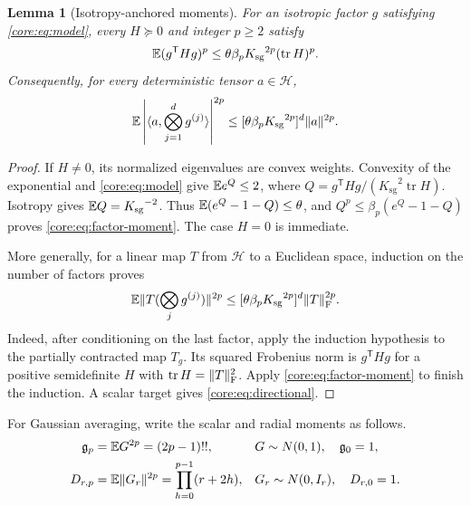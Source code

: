 \documentclass[11pt,a4paper]{article}
\newtheorem{lemma}[theorem]{Lemma}
\theoremstyle{definition}\newtheorem{definition}[theorem]{Definition}
\theoremstyle{remark}\newtheorem{remark}[theorem]{Remark}
\numberwithin{equation}{section}
\newcommand{\Ksg}{{K_{\mathrm{sg}}}}\newcommand{\Cfour}{{C_4}}
\newcommand{\gmom}{\mathfrak g}
\newcommand{\norm}[1]{\lVert#1\rVert}\newcommand{\ip}[2]{\langle#1,#2\rangle}
\DeclareMathOperator{\tr}{tr}\DeclareMathOperator{\rank}{rank}
\begin{document}
\begin{lemma}[Isotropy-anchored moments]\label{core:lem:factor}
For an isotropic factor $g$ satisfying \eqref{core:eq:model}, every $H\succeq0$ and
integer $p\ge2$ satisfy
\begin{equation}\label{core:eq:factor-moment}
 \E(g^{\mathsf T}Hg)^p\le
 \theta\beta_p\Ksg^{2p}(\tr H)^p.
\end{equation}
Consequently, for every deterministic tensor $a\in\mathcal H$,
\begin{equation}\label{core:eq:directional}
 \E\left|\ip a{\bigotimes_{j=1}^dg^{(j)}}\right|^{2p}
 \le[\theta\beta_p\Ksg^{2p}]^d\norm a^{2p}.
\end{equation}
\end{lemma}
\begin{proof}
If $H\ne0$, its normalized eigenvalues are convex weights. Convexity of
the exponential and \eqref{core:eq:model} give $\mathbb E e^Q\le2$, where
$Q=g^{\mathsf T}Hg/(\Ksg^2\tr H)$. Isotropy gives $\E Q=\Ksg^{-2}$.
Thus $\mathbb E(e^Q-1-Q)\le\theta$, and
$Q^p\le\beta_p(e^Q-1-Q)$ proves \eqref{core:eq:factor-moment}.
The case $H=0$ is immediate.

More generally, for a linear map $T$ from $\mathcal H$ to a Euclidean
space, induction on the number of factors proves
\[
 \E\norm{T(\bigotimes_jg^{(j)})}^{2p}
 \le[\theta\beta_p\Ksg^{2p}]^d\norm T_{\F}^{2p}.
\]
Indeed, after conditioning on the last factor, apply the induction
hypothesis to the partially contracted map $T_g$. Its squared Frobenius
norm is $g^{\mathsf T}Hg$ for a positive semidefinite $H$ with
$\tr H=\norm T_{\F}^2$. Apply \eqref{core:eq:factor-moment} to finish the
induction. A scalar target gives \eqref{core:eq:directional}.
\end{proof}

For Gaussian averaging, write the scalar and radial moments as follows.
\begin{equation}\label{core:eq:gaussian-moments}
 \begin{aligned}
 \gmom_p&=\E G^{2p}=(2p-1)!!,
       &&G\sim N(0,1),\quad\gmom_0=1,\\
 D_{r,p}&=\E\norm{G_r}^{2p}=\prod_{h=0}^{p-1}(r+2h),
       &&G_r\sim N(0,I_r),\quad D_{r,0}=1.
 \end{aligned}
\end{equation}
\end{document}
